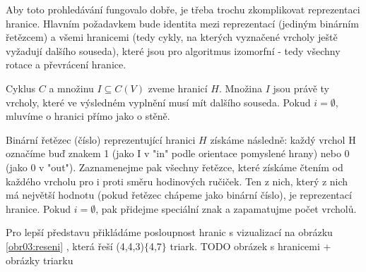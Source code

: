 Aby toto prohledávání fungovalo dobře, je třeba trochu zkomplikovat reprezentaci hranice. Hlavním požadavkem bude identita mezi reprezentací (jediným binárním řetězcem) a všemi hranicemi (tedy cykly, na kterých vyznačené vrcholy ještě vyžadují dalšího souseda), které jsou pro algoritmus izomorfní - tedy všechny rotace a převrácení hranice.

\begin{definice}\label{def01:1}
Cyklus $C$ a množinu $I \subseteq C(V)$ zveme hranicí $H$. Množina $I$ jsou právě ty vrcholy, které ve výsledném vyplnění musí mít dalšího souseda. Pokud  $i = \emptyset$, mluvíme o hranici přímo jako o stěně.

Binární řetězec (číslo) reprezentující hranici $H$ získáme následně: každý vrchol H označíme buď znakem 1 (jako I v "in" podle orientace pomyslené hrany) nebo 0 (jako 0 v "out"). Zaznamenejme pak všechny řetězce, které získáme čtením od každého vrcholu pro i proti směru hodinových ručiček. Ten z nich, který z nich má největší hodnotu (pokud řetězec chápeme jako binární číslo), je reprezentací hranice. Pokud $i = \emptyset$, pak přidejme speciální znak a zapamatujme počet vrcholů.
\end{definice}

Pro lepší představu přikládáme posloupnost hranic s vizualizací na obrázku \ref{obr03:reseni} , která řeší (4,4,3)$\lbrace$4,7$\rbrace$ triark. 
TODO obrázek s hranicemi + obrázky triarku

